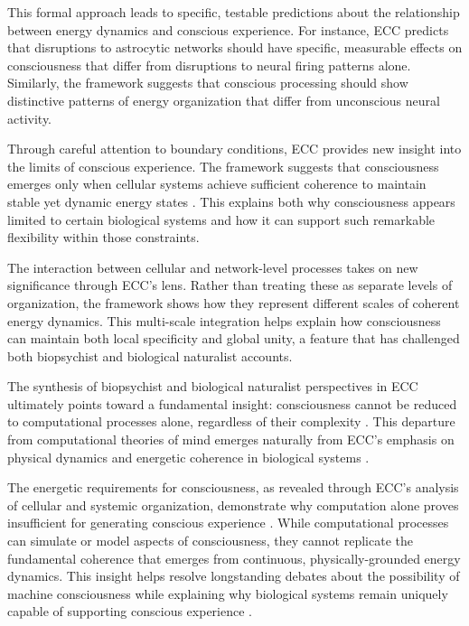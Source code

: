 \begin{refsection}
This formal approach leads to specific, testable predictions about the relationship between energy dynamics and conscious experience. For instance, ECC predicts that disruptions to astrocytic networks should have specific, measurable effects on consciousness that differ from disruptions to neural firing patterns alone. Similarly, the framework suggests that conscious processing should show distinctive patterns of energy organization that differ from unconscious neural activity.

Through careful attention to boundary conditions, ECC provides new insight into the limits of conscious experience. The framework suggests that consciousness emerges only when cellular systems achieve sufficient coherence to maintain stable yet dynamic energy states \cite{maturana1991autopoiesis}. This explains both why consciousness appears limited to certain biological systems and how it can support such remarkable flexibility within those constraints.

The interaction between cellular and network-level processes takes on new significance through ECC's lens. Rather than treating these as separate levels of organization, the framework shows how they represent different scales of coherent energy dynamics. This multi-scale integration helps explain how consciousness can maintain both local specificity and global unity, a feature that has challenged both biopsychist and biological naturalist accounts.

The synthesis of biopsychist and biological naturalist perspectives in ECC ultimately points toward a fundamental insight: consciousness cannot be reduced to computational processes alone, regardless of their complexity \cite{seth2024conscious}. This departure from computational theories of mind emerges naturally from ECC's emphasis on physical dynamics and energetic coherence in biological systems \cite{thompson2010mind}.

The energetic requirements for consciousness, as revealed through ECC's analysis of cellular and systemic organization, demonstrate why computation alone proves insufficient for generating conscious experience \cite{piccinini2013neural}. While computational processes can simulate or model aspects of consciousness, they cannot replicate the fundamental coherence that emerges from continuous, physically-grounded energy dynamics. This insight helps resolve longstanding debates about the possibility of machine consciousness while explaining why biological systems remain uniquely capable of supporting conscious experience \cite{margulis2001conscious}.


\end{refsection}
